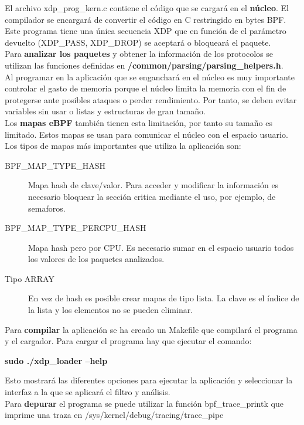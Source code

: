 El archivo xdp\_prog\_kern.c contiene el código que se cargará en el \textbf{núcleo}. El compilador se encargará de convertir el código en C restringido en bytes BPF. Este programa tiene una única secuencia XDP que en función de el parámetro devuelto (XDP\_PASS, XDP\_DROP) se aceptará o bloqueará el paquete.
\\Para \textbf{analizar los paquetes} y obtener la información de los protocolos se utilizan las funciones definidas en \textbf{/common/parsing/parsing\_helpers.h}.
\\Al programar en la aplicación que se enganchará en el núcleo es muy importante controlar el gasto de memoria porque el núcleo limita la memoria con el fin de protegerse ante posibles ataques o perder rendimiento. Por tanto, se deben evitar variables sin usar o listas y estructuras de gran tamaño.
\\Los \textbf{mapas eBPF} también tienen esta limitación, por tanto su tamaño es limitado. Estos mapas se usan para comunicar el núcleo con el espacio usuario. Los tipos de mapas más importantes que utiliza la aplicación son:
\begin{description}

  \item [BPF\_MAP\_TYPE\_HASH] Mapa hash de clave/valor. Para acceder y modificar la información es necesario bloquear la sección critica mediante el uso, por ejemplo, de semaforos.
  \item [BPF\_MAP\_TYPE\_PERCPU\_HASH] Mapa hash pero por CPU. Es necesario sumar en el espacio usuario todos los valores de los paquetes analizados.
  \item [Tipo ARRAY] En vez de hash es posible crear mapas de tipo lista. La clave es el índice de la lista y los elementos no se pueden eliminar.
\end{description}


Para \textbf{compilar} la aplicación se ha creado un Makefile que compilará el programa y el cargador. Para cargar el programa hay que ejecutar el comando:
\begin{center}
    \textbf{sudo ./xdp\_loader --help}
\end{center}
Esto mostrará las diferentes opciones para ejecutar la aplicación y seleccionar la interfaz a la que se aplicará el filtro y análisis.
\\Para \textbf{depurar} el programa se puede utilizar la función bpf\_trace\_printk que imprime una traza en /sys/kernel/debug/tracing/trace\_pipe